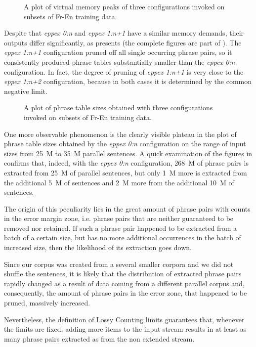 \begin{figure}[!htb]
  \centering
  
  \caption{
    A plot of virtual memory peaks of three \eppex{} configurations invoked on subsets of Fr-En training data.
  }
  \label{fig:fr-en-vm-peaks}
\end{figure}

Despite that \emph{eppex 0:n} and \emph{eppex 1:n+1} have a similar memory demands, their outputs
differ significantly, as  presents (the complete figures are part
of ).
The \emph{eppex 1:n+1} configuration pruned off all single occurring phrase pairs, so it consistently
produced phrase tables substantially smaller than the \emph{eppex 0:n} configuration.
In fact, the degree of pruning of \emph{eppex 1:n+1} is very close to the \emph{eppex 1:n+2} configuration,
because in both cases it is determined by the common negative limit.

\begin{figure}[!htb]
  \centering
  
  \caption{
    A plot of phrase table sizes obtained with three \eppex{} configurations invoked on subsets of Fr-En training data.
  }
  \label{fig:fr-en-phrase-table-sizes}
\end{figure}

One more observable phenomenon is the clearly visible plateau in the plot of phrase table sizes
obtained by the \emph{eppex 0:n} configuration on the range of input sizes from 25~M to 35~M parallel sentences.
A quick examination of the figures in  confirms that, indeed, with
the \emph{eppex 0:n} configuration, 268~M of phrase pairs is extracted from 25~M of parallel sentences,
but only 1~M more is extracted from the additional 5~M of sentences and 2~M more from the additional
10~M of sentences.

The origin of this peculiarity lies in the great amount of phrase pairs with counts in the error
margin zone, i.e. phrase pairs that are neither guaranteed to be removed nor retained.
If such a phrase pair happened to be extracted from a batch of a certain size, but has no more
additional occurrences in the batch of increased size, then the likelihood of its extraction
goes down.

Since our corpus was created from a several smaller corpora and we did not shuffle the sentences,
it is likely that the distribution of extracted phrase pairs rapidly changed as a result of data
coming from a different parallel corpus and, consequently, the amount of phrase pairs in the error zone,
that happened to be pruned, massively increased.

Nevertheless, the definition of Lossy Counting limits guarantees that,
whenever the limits are fixed, adding more items to the input stream results in at least
as many phrase pairs extracted as from the non extended stream.
